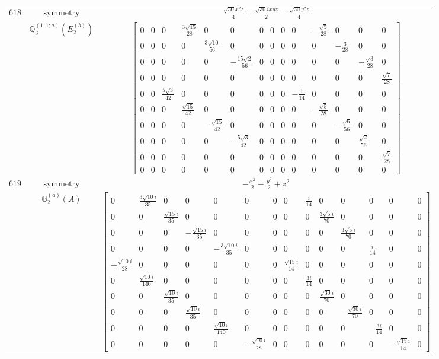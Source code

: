 \documentclass[fleqn,8pt,landscape]{jsarticle}
\begin{document}
\begin{longtable}{ccc}
$ 618 $ & $ \text{symmetry} $ & $ \frac{\sqrt{30} x^{2} z}{4} + \frac{\sqrt{30} i x y z}{2} - \frac{\sqrt{30} y^{2} z}{4} $ \\
$  $ & $ \mathbb{Q}_{3}^{(1,1;a)}(E_{2}^{(b)}) $ & $ \begin{bmatrix} 0 & 0 & 0 & \frac{3 \sqrt{15}}{28} & 0 & 0 & 0 & 0 & 0 & 0 & - \frac{\sqrt{5}}{28} & 0 & 0 & 0 \\ 0 & 0 & 0 & 0 & \frac{3 \sqrt{10}}{56} & 0 & 0 & 0 & 0 & 0 & 0 & - \frac{3}{28} & 0 & 0 \\ 0 & 0 & 0 & 0 & 0 & - \frac{15 \sqrt{2}}{56} & 0 & 0 & 0 & 0 & 0 & 0 & - \frac{\sqrt{3}}{28} & 0 \\ 0 & 0 & 0 & 0 & 0 & 0 & 0 & 0 & 0 & 0 & 0 & 0 & 0 & \frac{\sqrt{7}}{28} \\ 0 & 0 & \frac{5 \sqrt{3}}{42} & 0 & 0 & 0 & 0 & 0 & 0 & - \frac{1}{14} & 0 & 0 & 0 & 0 \\ 0 & 0 & 0 & \frac{\sqrt{15}}{42} & 0 & 0 & 0 & 0 & 0 & 0 & - \frac{\sqrt{5}}{28} & 0 & 0 & 0 \\ 0 & 0 & 0 & 0 & - \frac{\sqrt{15}}{42} & 0 & 0 & 0 & 0 & 0 & 0 & - \frac{\sqrt{6}}{56} & 0 & 0 \\ 0 & 0 & 0 & 0 & 0 & - \frac{5 \sqrt{3}}{42} & 0 & 0 & 0 & 0 & 0 & 0 & \frac{\sqrt{2}}{56} & 0 \\ 0 & 0 & 0 & 0 & 0 & 0 & 0 & 0 & 0 & 0 & 0 & 0 & 0 & \frac{\sqrt{7}}{28} \\ 0 & 0 & 0 & 0 & 0 & 0 & 0 & 0 & 0 & 0 & 0 & 0 & 0 & 0 \end{bmatrix} $ \\ \hline
$ 619 $ & $ \text{symmetry} $ & $ - \frac{x^{2}}{2} - \frac{y^{2}}{2} + z^{2} $ \\
$  $ & $ \mathbb{G}_{2}^{(a)}(A) $ & $ \begin{bmatrix} 0 & \frac{3 \sqrt{10} i}{35} & 0 & 0 & 0 & 0 & 0 & 0 & \frac{i}{14} & 0 & 0 & 0 & 0 & 0 \\ 0 & 0 & \frac{\sqrt{15} i}{35} & 0 & 0 & 0 & 0 & 0 & 0 & \frac{3 \sqrt{5} i}{70} & 0 & 0 & 0 & 0 \\ 0 & 0 & 0 & - \frac{\sqrt{15} i}{35} & 0 & 0 & 0 & 0 & 0 & 0 & \frac{3 \sqrt{5} i}{70} & 0 & 0 & 0 \\ 0 & 0 & 0 & 0 & - \frac{3 \sqrt{10} i}{35} & 0 & 0 & 0 & 0 & 0 & 0 & \frac{i}{14} & 0 & 0 \\ - \frac{\sqrt{10} i}{28} & 0 & 0 & 0 & 0 & 0 & 0 & \frac{\sqrt{15} i}{14} & 0 & 0 & 0 & 0 & 0 & 0 \\ 0 & \frac{\sqrt{10} i}{140} & 0 & 0 & 0 & 0 & 0 & 0 & \frac{3 i}{14} & 0 & 0 & 0 & 0 & 0 \\ 0 & 0 & \frac{\sqrt{10} i}{35} & 0 & 0 & 0 & 0 & 0 & 0 & \frac{\sqrt{30} i}{70} & 0 & 0 & 0 & 0 \\ 0 & 0 & 0 & \frac{\sqrt{10} i}{35} & 0 & 0 & 0 & 0 & 0 & 0 & - \frac{\sqrt{30} i}{70} & 0 & 0 & 0 \\ 0 & 0 & 0 & 0 & \frac{\sqrt{10} i}{140} & 0 & 0 & 0 & 0 & 0 & 0 & - \frac{3 i}{14} & 0 & 0 \\ 0 & 0 & 0 & 0 & 0 & - \frac{\sqrt{10} i}{28} & 0 & 0 & 0 & 0 & 0 & 0 & - \frac{\sqrt{15} i}{14} & 0 \end{bmatrix} $ \\ \hline

\end{longtable}
\end{document}
